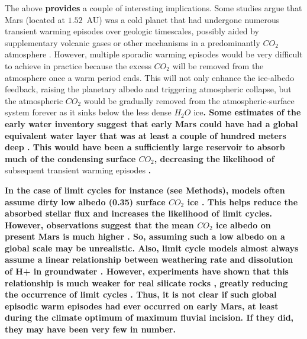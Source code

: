 \documentclass[fleqn,usenatbib]{mnras}
\providecommand{\DIFadd}[1]{{\bf #1}} %
\providecommand{\DIFdel}[1]{} %
\providecommand{\DIFaddbegin}{} %
\providecommand{\DIFaddend}{} %
\providecommand{\DIFdelbegin}{} %
\providecommand{\DIFdelend}{} %
\newcommand{\DIFscaledelfig}{0.5}
\newlength{\DIFdelgraphicswidth} %
\newlength{\DIFdelgraphicsheight} %
\newcommand{\DIFaddincludegraphics}[2][]{{\color{blue}\fbox{\DIFOincludegraphics[#1]{#2}}}} %
\newcommand{\DIFdelincludegraphics}[2][]{%
\sbox{\DIFdelgraphicsbox}{\DIFOincludegraphics[#1]{#2}}%
\settoboxwidth{\DIFdelgraphicswidth}{\DIFdelgraphicsbox} %
\settoboxtotalheight{\DIFdelgraphicsheight}{\DIFdelgraphicsbox} %
\scalebox{\DIFscaledelfig}{%
\parbox[b]{\DIFdelgraphicswidth}{\usebox{\DIFdelgraphicsbox}\\[-\baselineskip] \rule{\DIFdelgraphicswidth}{0em}}\llap{\resizebox{\DIFdelgraphicswidth}{\DIFdelgraphicsheight}{%
\setlength{\unitlength}{\DIFdelgraphicswidth}%
\begin{picture}(1,1)%
\thicklines\linethickness{2pt} %
{\color[rgb]{1,0,0}\put(0,0){\framebox(1,1){}}}%
{\color[rgb]{1,0,0}\put(0,0){\line( 1,1){1}}}%
{\color[rgb]{1,0,0}\put(0,1){\line(1,-1){1}}}%
\end{picture}%
}\hspace*{3pt}}} %
} %
\DeclareRobustCommand{\DIFaddbegin}{\DIFOaddbegin \let\includegraphics\DIFaddincludegraphics} %
\DeclareRobustCommand{\DIFaddend}{\DIFOaddend \let\includegraphics\DIFOincludegraphics} %
\DeclareRobustCommand{\DIFdelbegin}{\DIFOdelbegin \let\includegraphics\DIFdelincludegraphics} %
\DeclareRobustCommand{\DIFdelend}{\DIFOaddend \let\includegraphics\DIFOincludegraphics} %
\begin{document}
The above \DIFdelbegin \DIFdel{has }\DIFdelend \DIFaddbegin \DIFadd{provides }\DIFaddend a couple of interesting implications. Some studies argue that Mars (located at $1.52$~AU) was a cold planet that had undergone numerous transient warming episodes over geologic timescales, possibly aided by supplementary volcanic gases or other mechanisms in a predominantly $CO_{\mathrm{2}}$ atmosphere \DIFdelbegin \DIFdel{\citep{wordsworth2013,batalha2016}}\DIFdelend \DIFaddbegin \DIFadd{\citep{wordsworth2013,batalha2016,wordsworth_transient_2017,kite_methane_2020,hayworth_warming_2020}}\DIFaddend . However, multiple sporadic warming episodes would be very difficult to achieve in practice because the excess $CO_{\mathrm{2}}$ will be removed from the atmosphere once a warm period ends. This will not only enhance the ice-albedo feedback, raising the planetary albedo and triggering atmospheric collapse, but the atmospheric $CO_{\mathrm{2}}$ would be gradually removed from the atmospheric-surface system forever as it sinks below the less dense $H_{\mathrm{2}}O$ ice\DIFdelbegin \DIFdel{, making }\DIFdelend \DIFaddbegin \DIFadd{. Some estimates of the early water inventory suggest that early Mars could have had a global equivalent water layer that was at least a couple of hundred meters deep \citep{villanueva2015,ramirezetal2020}.  This would have been a sufficiently large reservoir to absorb much of the condensing surface $CO_{\mathrm{2}}$, decreasing the likelihood of }\DIFaddend subsequent transient warming episodes \DIFdelbegin \DIFdel{much less likely. }\DIFdelend \DIFaddbegin \DIFadd{\citep{Turbet2017}. 
}\DIFaddend 

\DIFaddbegin \DIFadd{In the case of limit cycles for instance (see Methods), models often assume dirty low albedo (0.35) surface $CO_{\mathrm{2}}$ ice \citep{batalha2016, kadoya_outer_2019,hayworth_warming_2020}. This helps reduce the absorbed stellar flux and increases the likelihood of limit cycles. However, observations suggest that the mean $CO_{\mathrm{2}}$ ice albedo on present Mars is much higher \citep{forget2013}. So, assuming such a low albedo on a global scale may be unrealistic. Also, limit cycle models almost always assume a linear relationship between weathering rate and dissolution of H+ in groundwater \citep{batalha2016,kadoya_outer_2019,hayworth_warming_2020}. However, experiments have shown that this relationship is much weaker for real silicate rocks \citep{asolekar1991}, greatly reducing the occurrence of limit cycles \citep{ramirez2017mars}. Thus, it is not clear if such global episodic warm episodes had ever occurred on early Mars, at least during the climate optimum of maximum fluvial incision. If they did, they may have been very few in number.  
}
\end{document}
